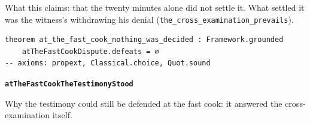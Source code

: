 \documentclass[11pt]{article}
\begin{document}
What this claims: that the twenty minutes alone did not settle it. What settled it was the witness’s withdrawing his denial (\texttt{the\_\allowbreak{}cross\_\allowbreak{}examination\_\allowbreak{}prevails}).

{\small\begin{verbatim}
theorem at_the_fast_cook_nothing_was_decided : Framework.grounded
    atTheFastCookDispute.defeats = ∅
-- axioms: propext, Classical.choice, Quot.sound
\end{verbatim}}
\par\medskip\noindent\textbf{\texttt{at\allowbreak{}The\allowbreak{}Fast\allowbreak{}Cook\allowbreak{}The\allowbreak{}Testimony\allowbreak{}Stood}}\par\nobreak\noindent
Why the testimony could still be defended at the fast cook: it answered the cross-examination itself.
\end{document}
